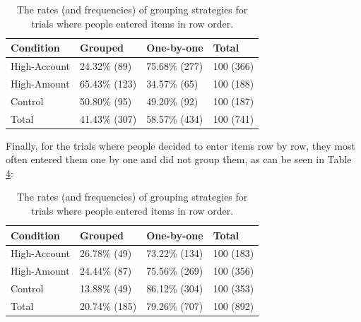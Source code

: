 \begin{table}
\begin{itemize}
 
\begin{table}[]
\centering
\begin{tabular}{|l|l|l|l|}
\hline
Condition    & Grouped       & One-by-one    & Total     \\ \hline
High-Account & 24.32\% {\footnotesize (89)}     & 75.68\% {\footnotesize (277)}    & 100 {\footnotesize (366)} \\ \hline
High-Amount  & 65.43\% {\footnotesize (123)} & 34.57\% {\footnotesize (65)}  & 100 {\footnotesize (188)} \\ \hline
Control      & 50.80\% {\footnotesize (95)}  & 49.20\% {\footnotesize (92)}  & 100 {\footnotesize (187)} \\ \hline
Total        & 41.43\% {\footnotesize (307)} & 58.57\% {\footnotesize (434)} & 100 {\footnotesize (741)} \\ \hline
\end{tabular}
\caption{The rates (and frequencies) of grouping strategies for trials where people entered items in column order.}\label{table:ch34_group-column}
\end{table}

Finally, for the trials where people decided to enter items row by row, they most often entered them one by one and did not group them, as can be seen in Table \ref{table:ch34_group-row}:
\begin{table}[]
\centering
\begin{tabular}{|l|l|l|l|}
\hline
Condition    & Grouped       & One-by-one    & Total     \\ \hline
High-Account & 26.78\% {\footnotesize (49)}  & 73.22\% {\footnotesize (134)} & 100 {\footnotesize (183)} \\ \hline
High-Amount  & 24.44\% {\footnotesize (87)}  & 75.56\% {\footnotesize (269)} & 100 {\footnotesize (356)} \\ \hline
Control      & 13.88\% {\footnotesize (49)}  & 86.12\% {\footnotesize (304)} & 100 {\footnotesize (353)} \\ \hline
Total        & 20.74\% {\footnotesize (185)} & 79.26\% {\footnotesize (707)} & 100 {\footnotesize (892)} \\ \hline
\end{tabular}
\caption{The rates (and frequencies) of grouping strategies for trials where people entered items in row order.}\label{table:ch34_group-row}
\end{table}


\end{itemize}
\end{table}
